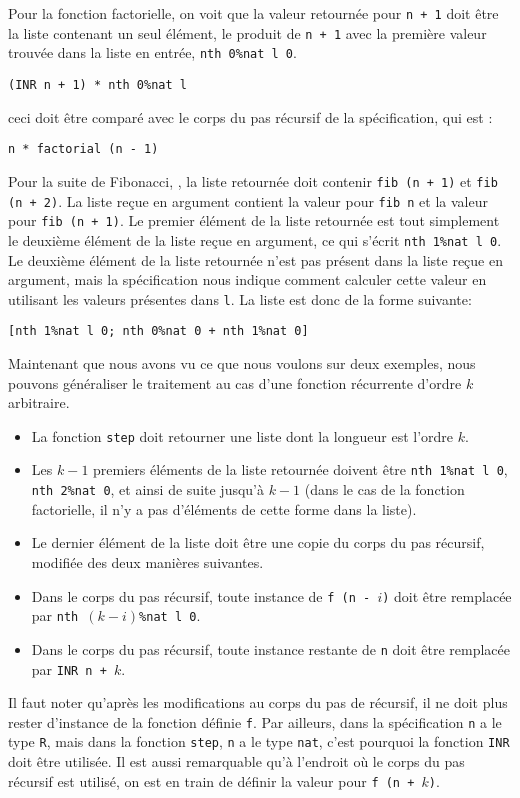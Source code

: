 \documentclass[draft]{jflart}
\begin{document}
Pour la fonction factorielle, on voit que la valeur retournée pour
\texttt{n + 1} doit être la liste contenant un seul élément,
le produit de \texttt{n + 1} avec
la première valeur trouvée dans la liste en entrée, \texttt{nth 0\%nat l 0}.
\begin{verbatim}
(INR n + 1) * nth 0%nat l
\end{verbatim}
ceci doit être comparé avec le corps du pas récursif de la
spécification, qui est :
\begin{verbatim}
n * factorial (n - 1)
\end{verbatim}

Pour la suite de Fibonacci, , la liste retournée doit
contenir \texttt{fib (n + 1)} et \texttt{fib (n + 2)}.
La liste reçue en argument contient la valeur pour \texttt{fib
    n} et la valeur pour \texttt{fib (n + 1)}.  Le premier
élément de la liste retournée est tout simplement le deuxième élément
de la liste reçue en argument, ce qui s'écrit \texttt{nth 1\%nat l 0}.
Le deuxième élément de la liste retournée n'est pas présent dans la
liste reçue en argument, mais la spécification nous indique comment
calculer cette valeur en utilisant les valeurs présentes dans \texttt{l}.
La liste est donc de la forme suivante:
\begin{verbatim}
[nth 1%nat l 0; nth 0%nat 0 + nth 1%nat 0]
\end{verbatim}

Maintenant que nous avons vu ce que nous voulons sur deux exemples,
nous pouvons généraliser le traitement au cas d'une fonction
récurrente d'ordre \(k\) arbitraire.
\begin{itemize}
\item La fonction \texttt{step} doit
retourner une liste dont la longueur est l'ordre \(k\).
\item Les \(k-1\) premiers éléments de la liste retournée doivent
  être \texttt{nth 1\%nat l 0}, \texttt{nth 2\%nat 0}, et ainsi de suite
jusqu'à \(k - 1\)
  (dans le cas de la fonction factorielle, il n'y a pas d'éléments de
  cette forme dans la liste).
\item Le dernier élément de la liste doit être une copie du corps du
  pas récursif, modifiée des deux manières suivantes.
\item Dans le corps du pas récursif, toute instance de \texttt{f (n -
  \(i\))} doit être remplacée par \texttt{nth \((k - i)\)\%nat l 0}.
\item Dans le corps du pas récursif, toute instance restante de \texttt{n} doit
  être remplacée par \texttt{INR n + \(k\)}.
\end{itemize}
Il faut noter qu'après les modifications au corps du pas de récursif,
il ne doit plus rester d'instance de la fonction définie \texttt{f}.  Par
ailleurs, dans la spécification \texttt{n} a le type \texttt{R}, mais dans
la fonction \texttt{step}, \texttt{n} a le type \texttt{nat}, c'est pourquoi la
fonction \texttt{INR} doit être utilisée.  Il est aussi remarquable qu'à
l'endroit où le corps du pas récursif est utilisé, on est en train de
définir la valeur pour \texttt{f (n + \(k\))}.
\end{document}
